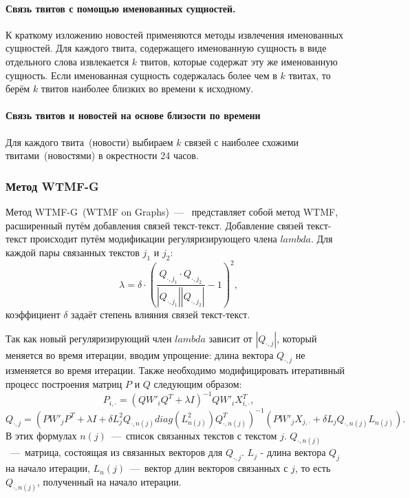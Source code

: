         \paragraph{Связь твитов с помощью именованных сущностей.}
            К краткому изложению новостей применяются методы извлечения именованных сущностей.
            Для каждого твита, содержащего именованную сущность в виде отдельного слова извлекается $k$ твитов, которые содержат эту же именованную сущность.
            Если именованная сущность содержалась более чем в $k$ твитах, то берём $k$ твитов наиболее близких во времени к исходному.

        \paragraph{Связь твитов и новостей на основе близости по времени}
            Для каждого твита~(новости) выбираем $k$ связей с наиболее схожими твитами~(новостями) в окрестности 24 часов.
    \subsubsection{Метод WTMF-G}
        Метод WTMF-G~(WTMF on Graphs)~---~ представляет собой метод WTMF, расширенный путём добавления связей текст-текст.
        Добавление связей текст-текст происходит путём модификации регуляризирующего члена $lambda$. Для каждой пары связанных текстов $j_1$ и $j_2$:
        $$\lambda = \delta \cdot (\dfrac{Q_{\cdot,j_1}\cdot Q_{\cdot,j_2}}{|Q_{\cdot,j_1}|| Q_{\cdot,j_2}|}-1)^2,$$
        коэффициент $\delta$ задаёт степень влияния связей текст-текст.

        Так как новый регуляризирующий член $lambda$ зависит от $|Q_{\cdot,j}|$, который меняется во время итерации, вводим упрощение: длина вектора $Q_{\cdot,j}$ не изменяется во время итерации.
        Также необходимо модифицировать итеративный процесс построения матриц $P$ и $Q$ следующим образом:
        $$P_{i, \cdot} = (Q W'_i Q^T + \lambda I)^{-1} Q W'_i X_{i,\cdot}^T,$$
        $$Q_{\cdot, j} = (P W'_j P^T + \lambda I + \delta  L_j^2 Q_{\cdot,n(j)} diag(L^2_{n(j)})Q_{\cdot,n(j)}^T)^{-1}   (P W'_j X_{j,\cdot} + \delta  L_j Q_{\cdot,n(j)} L_{n(j)}).$$
        В этих формулах $n(j)$~---~список связанных текстов с текстом $j$. $Q_{\cdot,n(j)}$~---~матрица, состоящая из связанных векторов для $Q_{\cdot, j}$.
        $L_j$ - длина вектора $Q_j$ на начало итерации, $L_n(j)$~---~вектор длин векторов связанных с $j$, то есть $Q_{\cdot,n(j)}$, полученный на начало итерации.
